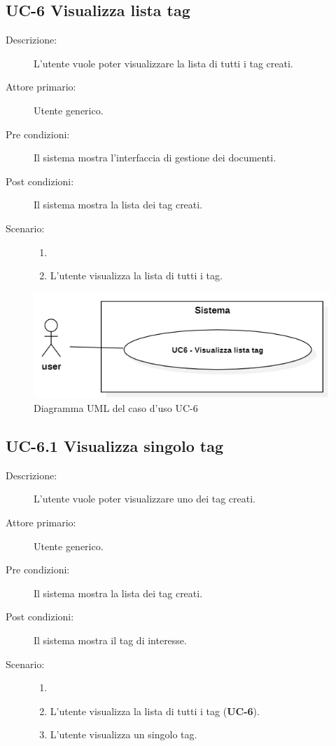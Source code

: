 \subsection{UC-6 Visualizza lista tag}
\begin{description}
    \item[Descrizione:] L’utente vuole poter visualizzare la lista di tutti i tag creati.
    \item[Attore primario:] Utente generico.
    \item[Pre condizioni:] Il sistema mostra l'interfaccia di gestione dei documenti.
    \item[Post condizioni:] Il sistema mostra la lista dei tag creati.
    \item[Scenario:]
    \begin{enumerate}
        \item[]
        \item L’utente visualizza la lista di tutti i tag.
    \end{enumerate}
\end{description}
\begin{figure}[H]
    \centering
    \includegraphics[width=0.8\linewidth]{UC6.png} %
    \caption{Diagramma UML del caso d'uso UC-6}
    \label{fig:UC8}
\end{figure}

\subsection{UC-6.1 Visualizza singolo tag}
\begin{description}
    \item[Descrizione:] L’utente vuole poter visualizzare uno dei tag creati.
    \item[Attore primario:] Utente generico.
    \item[Pre condizioni:] Il sistema mostra la lista dei tag creati.
    \item[Post condizioni:] Il sistema mostra il tag di interesse.
    \item[Scenario:]
    \begin{enumerate}
        \item[]
        \item L’utente visualizza la lista di tutti i tag (\textbf{UC-6}).
        \item L'utente visualizza un singolo tag.
    \end{enumerate}
\end{description}

